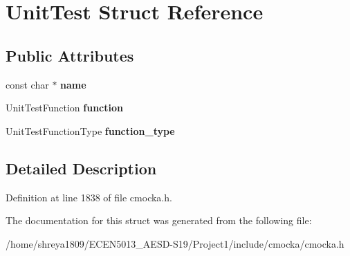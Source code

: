 \hypertarget{structUnitTest}{}\section{Unit\+Test Struct Reference}
\label{structUnitTest}
\subsection*{Public Attributes}
\begin{DoxyCompactItemize}
\item 
\mbox{\label{structUnitTest_abdb6119bbcda2106f1a47a76a80aac16}} 
const char $\ast$ {\bfseries name}
\item 
\mbox{\label{structUnitTest_ab2683504dd77ec4b245424b8629bec53}} 
Unit\+Test\+Function {\bfseries function}
\item 
\mbox{\label{structUnitTest_a07743df4563f54b325b3fff4859c502c}} 
Unit\+Test\+Function\+Type {\bfseries function\+\_\+type}
\end{DoxyCompactItemize}


\subsection{Detailed Description}


Definition at line 1838 of file cmocka.\+h.



The documentation for this struct was generated from the following file\+:\begin{DoxyCompactItemize}
\item 
/home/shreya1809/\+E\+C\+E\+N5013\+\_\+\+A\+E\+S\+D-\/\+S19/\+Project1/include/cmocka/cmocka.\+h\end{DoxyCompactItemize}
